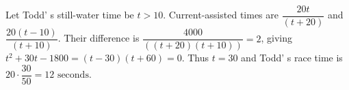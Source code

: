 Let Todd' s still-water time be $t>10$. Current-assisted times are $\dfrac{20t}{(t+20)}$ and $\dfrac{20(t-10)}{(t+10)}$. Their difference is $\dfrac{4000}{((t+20)(t+10))}=2$, giving $t^2+30t-1800=(t-30)(t+60)=0$. Thus $t=30$ and Todd' s race time is $20\cdot\dfrac{30}{50}=\boxed{12\text{ seconds}}$.
